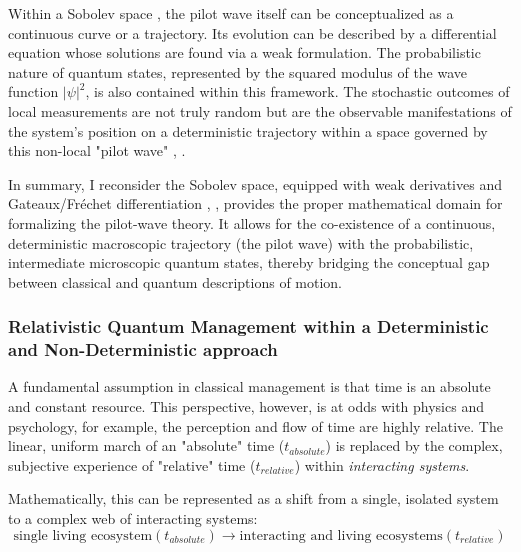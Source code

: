 \documentclass{article}
\begin{document}
Within a Sobolev space \cite{sobolev1938}, the pilot wave itself can be conceptualized as a continuous curve or a trajectory. Its evolution can be described by a differential equation whose solutions are found via a weak formulation. The probabilistic nature of quantum states, represented by the squared modulus of the wave function $|\psi|^2$, is also contained within this framework. The stochastic outcomes of local measurements are not truly random but are the observable manifestations of the system's position on a deterministic trajectory within a space governed by this non-local "pilot wave" \cite{bohm1952suggested1}, \cite{debroglie1927nouvelle}.

In summary, I reconsider the Sobolev space, equipped with weak derivatives and Gateaux/Fréchet differentiation \cite{frechet1909calcul}, \cite{gateaux1919fonctions}, provides the proper mathematical domain for formalizing the pilot-wave theory. It allows for the co-existence of a continuous, deterministic macroscopic trajectory (the pilot wave) with the probabilistic, intermediate microscopic quantum states, thereby bridging the conceptual gap between classical and quantum descriptions of motion.
\newpage
\subsubsection*{Relativistic Quantum Management within a Deterministic and Non-Deterministic approach}
\label{RQM}
A fundamental assumption in classical management is that time is an absolute and constant resource. This perspective, however, is at odds with physics and psychology, for example, the perception and flow of time are highly relative. The linear, uniform march of an "absolute" time ($t_{absolute}$) is replaced by the complex, subjective experience of "relative" time ($t_{relative}$) within \textit{interacting systems}.
 
 Mathematically, this can be represented as a shift from a single, isolated system to a complex web of interacting systems:
 $$ \text{single living ecosystem}(t_{absolute}) \rightarrow \text{interacting and living ecosystems}(t_{relative}) $$
\end{document}
